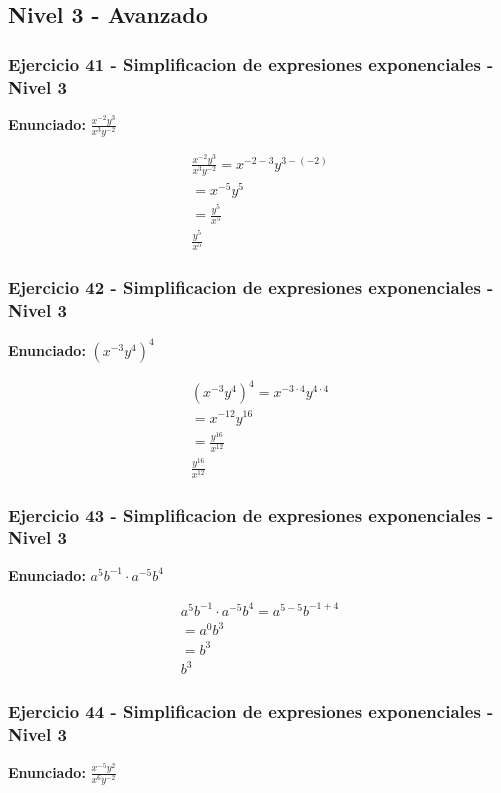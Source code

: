 \documentclass[12pt,a4paper]{article}
\begin{document}
\newpage

\subsection*{Nivel 3 - Avanzado}

\subsubsection*{Ejercicio 41 - Simplificacion de expresiones exponenciales - Nivel 3}
\textbf{Enunciado:} \(\frac{x^{-2}y^{3}}{x^{3}y^{-2}}\)

\[
\begin{aligned}
\frac{x^{-2}y^{3}}{x^{3}y^{-2}}=x^{-2-3}y^{3-(-2)}\\
=x^{-5}y^{5}\\
=\frac{y^{5}}{x^{5}}\\
\boxed{\frac{y^{5}}{x^{5}}}
\end{aligned}
\]


\subsubsection*{Ejercicio 42 - Simplificacion de expresiones exponenciales - Nivel 3}
\textbf{Enunciado:} \(\left(x^{-3}y^{4}\right)^{4}\)

\[
\begin{aligned}
\left(x^{-3}y^{4}\right)^{4}=x^{-3\cdot 4}y^{4\cdot 4}\\
=x^{-12}y^{16}\\
=\frac{y^{16}}{x^{12}}\\
\boxed{\frac{y^{16}}{x^{12}}}
\end{aligned}
\]


\subsubsection*{Ejercicio 43 - Simplificacion de expresiones exponenciales - Nivel 3}
\textbf{Enunciado:} \(a^{5}b^{-1}\cdot a^{-5}b^{4}\)

\[
\begin{aligned}
a^{5}b^{-1}\cdot a^{-5}b^{4}=a^{5-5}b^{-1+4}\\
=a^{0}b^{3}\\
=b^{3}\\
\boxed{b^{3}}
\end{aligned}
\]


\subsubsection*{Ejercicio 44 - Simplificacion de expresiones exponenciales - Nivel 3}
\textbf{Enunciado:} \(\frac{x^{-5}y^{2}}{x^{6}y^{-2}}\)
\end{document}
